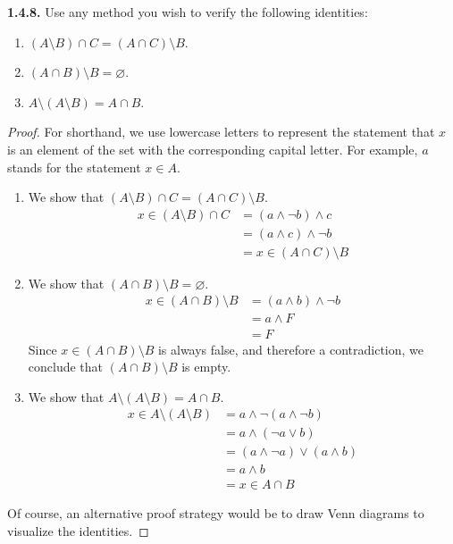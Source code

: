 \documentclass[12pt]{amsart}
\newenvironment{statement}[1]{\smallskip\noindent\color[rgb]{.6627, .3529, .6314} {\bf #1.}}{}
\theoremstyle{definition}
\theoremstyle{remark}
\begin{document}
\begin{statement}{1.4.8}
Use any method you wish to verify the following identities:
\begin{enumerate}
	\item $(A \setminus B) \cap C = (A \cap C) \setminus B$.
	\item $(A \cap B) \setminus B = \varnothing$.
	\item $A \setminus (A \setminus B) = A \cap B$.
\end{enumerate}
\end{statement}

\begin{proof}
For shorthand, we use lowercase letters to represent the statement that $x$ is an element of the set with the corresponding capital letter.
For example, $a$ stands for the statement $x \in A$.
\begin{enumerate}
	\item We show that $(A \setminus B) \cap C = (A \cap C) \setminus B$.
	\begin{align*}
		x \in (A \setminus B) \cap C
		&= (a \wedge \neg b) \wedge c \\
		&= (a \wedge c) \wedge \neg b \\
		&= x \in (A \cap C) \setminus B
	\end{align*}
	
	\item We show that $(A \cap B) \setminus B = \varnothing$.
	\begin{align*}
		x \in (A \cap B) \setminus B
		&= (a \wedge b) \wedge \neg b \\
		&= a \wedge F \\
		&= F
	\end{align*}
	Since $x \in (A \cap B) \setminus B$ is always false, and therefore a contradiction, we conclude that $(A \cap B) \setminus B$ is empty.
	
	\item We show that $A \setminus (A \setminus B) = A \cap B$.
	\begin{align*}
		x \in A \setminus (A \setminus B)
		&= a \wedge \neg (a \wedge \neg b) \\
		&= a \wedge (\neg a \vee b) \\
		&= (a \wedge \neg a) \vee (a \wedge b) \\
		&= a \wedge b \\
		&= x \in A \cap B
	\end{align*}
\end{enumerate}
Of course, an alternative proof strategy would be to draw Venn diagrams to visualize the identities.
\end{proof}
\end{document}

